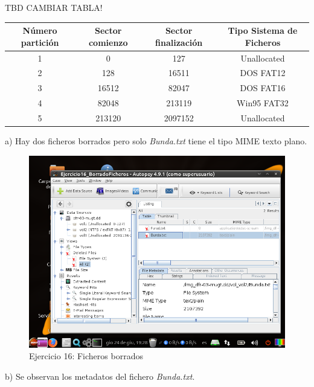 \documentclass[11pt]{article}
\begin{document}
TBD CAMBIAR TABLA!
\begin{table}[H]
    \centering
    \begin{tabular}{|c|c|c|c|}
        \hline
        Número partición & Sector comienzo & Sector finalización & Tipo Sistema de Ficheros \\
        \hline\hline
        1 & 0 & 127 & Unallocated \\
        \hline
        2 & 128 & 16511 & DOS FAT12 \\
        \hline
        3 & 16512 & 82047 & DOS FAT16 \\
        \hline
        4 & 82048 & 213119 & Win95 FAT32 \\
        \hline
        5 & 213120 & 2097152 & Unallocated \\
        \hline
    \end{tabular}
\end{table}

a) Hay dos ficheros borrados pero solo \textit{Bunda.txt} tiene el tipo MIME texto plano.

\begin{figure}[H]
    \caption{Ejercicio 16: Ficheros borrados}
    \centering
    \includegraphics[scale=0.7]{e16-6.png}
\end{figure}

b) Se observan los metadatos del fichero \textit{Bunda.txt}. 
\end{document}
